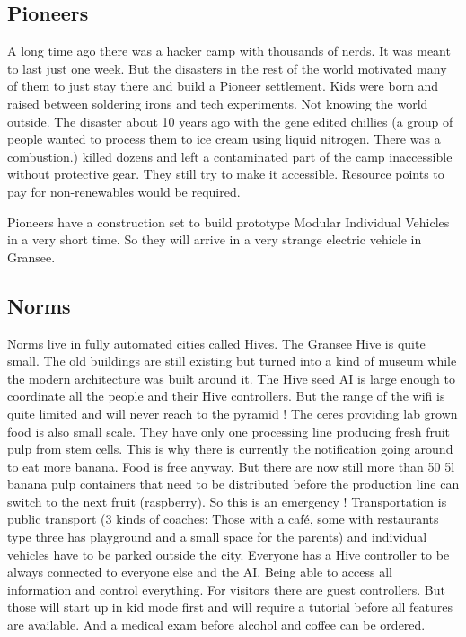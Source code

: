 \subsection{Pioneers}

A long time ago there was a hacker camp with thousands of nerds. It was meant to last just one week. But the disasters in the rest of the world motivated many of them to just stay there and build a Pioneer settlement. Kids were born and raised between soldering irons and tech experiments. Not knowing the world outside. The disaster about 10 years ago with the gene edited chillies (a group of people wanted to process them to ice cream using liquid nitrogen. There was a combustion.) killed dozens and left a contaminated part of the camp inaccessible without protective gear. They still try to make it accessible. Resource points to pay for non-renewables would be required.

Pioneers have a construction set to build prototype Modular Individual Vehicles in a very short time. So they will arrive in a very strange electric vehicle in Gransee.

\subsection{Norms}

Norms live in fully automated cities called Hives. The Gransee Hive is quite small. The old buildings are still existing but turned into a kind of museum while the modern architecture was built around it. The Hive seed AI is large enough to coordinate all the people and their Hive controllers. But the range of the wifi is quite limited and will never reach to the pyramid !
The ceres providing lab grown food is also small scale. They have only one processing line producing fresh fruit pulp from stem cells. This is why there is currently the notification going around to eat more banana. Food is free anyway. But there are now still more than 50  5l banana pulp containers that need to be distributed before the production line can switch to the next fruit (raspberry). So this is an emergency !
Transportation is public transport (3 kinds of coaches: Those with a café, some with restaurants type three has playground and a small space for the parents) and individual vehicles have to be parked outside the city.
Everyone has a Hive controller to be always connected to everyone else and the AI. Being able to access all information and control everything. For visitors there are guest controllers. But those will start up in kid mode first and will require a tutorial before all features are available. And a medical exam before alcohol and coffee can be ordered.

